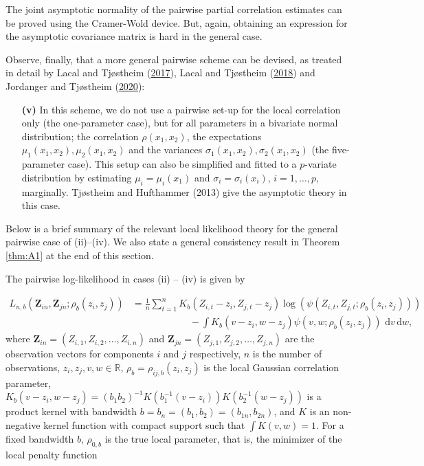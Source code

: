 \documentclass[
  12pt,
  letterpaper]{article}
\numberwithin{equation}{section}
\newcommand{\Z}{\bm{Z}}
\newcommand{\di}{\,\textrm{d}}
\begin{document}
The joint asymptotic normality of the pairwise partial correlation estimates can be proved using the Cramer-Wold device. But, again, obtaining an expression for the asymptotic covariance matrix is hard in the general case.

Observe, finally, that a more general pairwise scheme can be devised, as treated in detail by Lacal and Tjøstheim (\protect\hyperlink{ref-lacal2017local}{2017}), Lacal and Tjøstheim (\protect\hyperlink{ref-lacal2018estimating}{2018}) and Jordanger and Tjøstheim (\protect\hyperlink{ref-jordanger2017nonlinear}{2020}):

\begin{itemize}
\item[\textbf{(v)}] In this scheme, we do not use a pairwise set-up for the local correlation only (the one-parameter case), but for all parameters in a bivariate normal distribution; the correlation $\rho(x_1, x_2)$, the expectations $\mu_1(x_1,x_2), \mu_2(x_1,x_2)$ and the variances $\sigma_1(x_1,x_2),\sigma_2(x_1,x_2)$ (the five-parameter case). This setup can also be simplified and fitted to a $p$-variate distribution by estimating $\mu_i = \mu_i(x_1)$ and $\sigma_i = \sigma_i(x_i)$, $i=1,\ldots,p$, marginally. Tjøstheim and Hufthammer (2013) give the asymptotic theory in this case. 
\end{itemize}

Below is a brief summary of the relevant local likelihood theory for the general pairwise case of (ii)--(iv). We also state a general consistency result in Theorem \ref{thm:A1} at the end of this section.

The pairwise log-likelihood in cases (ii) -- (iv) is given by

\begin{align}
L_{n,b}(\Z_{in}, \Z_{jn}; \rho_b(z_i, z_j)) &= \frac{1}{n}\sum_{t=1}^n K_b(Z_{i,t} - z_i, Z_{j,t} - z_j)\log\left(\psi(Z_{i,t}, Z_{j,t}; \rho_b(z_i, z_j))\right) \nonumber \\  
& \qquad\qquad\qquad - \int K_b(v-z_i, w- z_j)\psi(v,w;\rho_b(z_i, z_j)) \, \di v \di w,
\label{eq:loglikelihood}
\end{align}
where \(\Z_{in} = (Z_{i,1}, Z_{i,2}, \ldots, Z_{i,n})\) and \(\Z_{jn} = (Z_{j,1}, Z_{j,2}, \ldots, Z_{j,n})\) are the observation vectors for components \(i\) and \(j\) respectively, \(n\) is the number of observations, \(z_i, z_j, v, w \in \mathbb{R}\), \(\rho_b = \rho_{ij,b}(z_i,z_j)\) is the local Gaussian correlation parameter, \(K_b(v-z_i, w-z_j) = (b_1b_2)^{-1}K(b_1^{-1}(v-z_i))K(b_2^{-1}(w-z_j))\) is a product kernel with bandwidth \(b=b_n=(b_1,b_2) = (b_{1n}, b_{2n})\), and \(K\) is an non-negative kernel function with compact support such that \(\int K(v,w) = 1\). For a fixed bandwidth \(b\), \(\rho_{0,b}\) is the true local parameter, that is, the minimizer of the local penalty function
\end{document}

